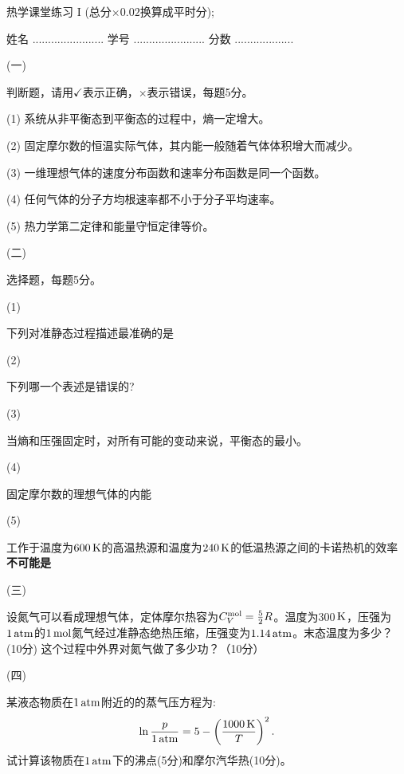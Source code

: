 \documentclass[12pt,CJK]{article}
\begin{document}
\bch
{\large 热学课堂练习 I (总分$\times 0.02$换算成平时分);}


姓名 ....................... {\hskip 0.5in}    学号 .......................{\hskip 0.5in}  分数 ...................


\bitem
\item[(一)]{判断题，请用$\checkmark$表示正确，$\times$表示错误，每题5分。

  \bitem
\item[(1)]{系统从非平衡态到平衡态的过程中，熵一定增大。\bropt}
\item[(2)]{固定摩尔数的恒温实际气体，其内能一般随着气体体积增大而减少。\bropt}
\item[(3)]{一维理想气体的速度分布函数和速率分布函数是同一个函数。\bropt}
\item[(4)]{任何气体的分子方均根速率都不小于分子平均速率。\bropt}
\item[(5)]{热力学第二定律和能量守恒定律等价。 \bropt}
  \eitem
}

\item[(二)]{选择题，每题5分。

  \bitem
  \item[(1)]{
  下列对准静态过程描述最准确的是 \bropt


}

\item[(2)]{
  下列哪一个表述是错误的? \bropt
  

}

\item[(3)]{
  当熵和压强固定时，对所有可能的变动来说，平衡态的\bropt 最小。

}

\item[(4)]{
  固定摩尔数的理想气体的内能 \bropt

  
}

\item[(5)]{
  工作于温度为$600\,\mathrm{K}$的高温热源和温度为$240\,\mathrm{K}$的低温热源之间的卡诺热机的效率{\bf 不可能是} \bropt

}
  \eitem
  }
\item[(三)]{设氮气可以看成理想气体，定体摩尔热容为$C_V^{\rm mol}=\frac{5}{2}R$。温度为300$\,\mathrm{K}$，压强为$1\,\mathrm{atm}$的$1\,\mathrm{mol}$氮气经过准静态绝热压缩，压强变为$1.14\,\mathrm{atm}$。末态温度为多少？(10分) 这个过程中外界对氮气做了多少功？（10分）

    \vspace{3.5in}


  }
\item[(四)]{某液态物质在$1\,\mathrm{atm}$附近的的蒸气压方程为: $$ \ln\frac{p}{1\,\mathrm{atm}} = 5 -\left(\frac{1000\,\mathrm{K}}{T}\right)^2.$$试计算该物质在$1\,\mathrm{atm}$下的沸点(5分)和摩尔汽华热(10分)。


    \vspace{2.3in}
  }
\end{document}
